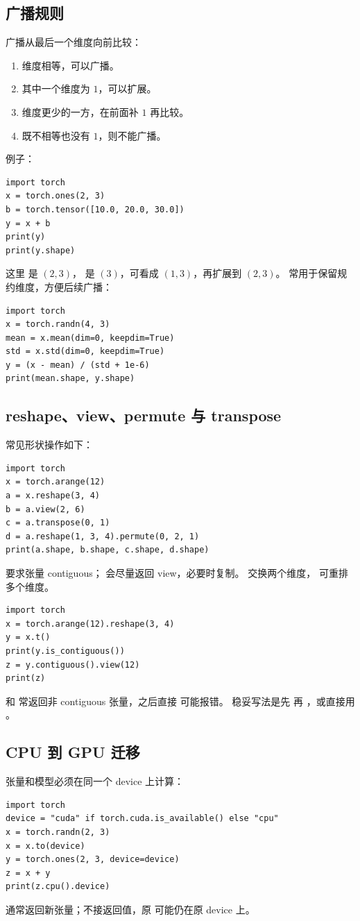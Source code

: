 \subsection{广播规则}
广播从最后一个维度向前比较：
\begin{enumerate}[label=\arabic*.]
  \item 维度相等，可以广播。
  \item 其中一个维度为 $1$，可以扩展。
  \item 维度更少的一方，在前面补 $1$ 再比较。
  \item 既不相等也没有 $1$，则不能广播。
\end{enumerate}
例子：
\begin{lstlisting}
import torch
x = torch.ones(2, 3)
b = torch.tensor([10.0, 20.0, 30.0])
y = x + b
print(y)
print(y.shape)
\end{lstlisting}
这里  是 $(2,3)$， 是 $(3)$，可看成 $(1,3)$，再扩展到 $(2,3)$。
 常用于保留规约维度，方便后续广播：
\begin{lstlisting}
import torch
x = torch.randn(4, 3)
mean = x.mean(dim=0, keepdim=True)
std = x.std(dim=0, keepdim=True)
y = (x - mean) / (std + 1e-6)
print(mean.shape, y.shape)
\end{lstlisting}

\subsection{reshape、view、permute 与 transpose}
常见形状操作如下：
\begin{lstlisting}
import torch
x = torch.arange(12)
a = x.reshape(3, 4)
b = a.view(2, 6)
c = a.transpose(0, 1)
d = a.reshape(1, 3, 4).permute(0, 2, 1)
print(a.shape, b.shape, c.shape, d.shape)
\end{lstlisting}
 要求张量 contiguous； 会尽量返回 view，必要时复制。
 交换两个维度， 可重排多个维度。
\begin{lstlisting}
import torch
x = torch.arange(12).reshape(3, 4)
y = x.t()
print(y.is_contiguous())
z = y.contiguous().view(12)
print(z)
\end{lstlisting}
\begin{trap}
 和  常返回非 contiguous 张量，之后直接  可能报错。
稳妥写法是先  再 ，或直接用 。
\end{trap}

\subsection{CPU 到 GPU 迁移}
张量和模型必须在同一个 device 上计算：
\begin{lstlisting}
import torch
device = "cuda" if torch.cuda.is_available() else "cpu"
x = torch.randn(2, 3)
x = x.to(device)
y = torch.ones(2, 3, device=device)
z = x + y
print(z.cpu().device)
\end{lstlisting}
 通常返回新张量；不接返回值，原  可能仍在原 device 上。

